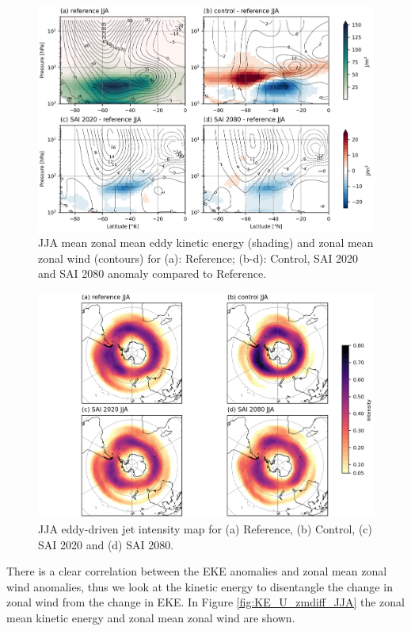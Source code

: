 \begin{figure}[H]
	\centering
	\includegraphics[width=0.95\linewidth]{images/EKE_U_zmdiff_JJA.png}
	\caption{JJA mean zonal mean eddy kinetic energy (shading) and zonal mean zonal wind (contours) for (a): Reference; (b-d): Control, SAI 2020 and SAI 2080 anomaly compared to Reference.}
	\label{fig:EKE_U_zmdiff_JJA}
\end{figure}

\begin{figure}[H]
	\centering
	\includegraphics[width=0.95\linewidth]{images/EDJ_map_JJA.png}
	\caption{JJA eddy-driven jet intensity map for (a) Reference, (b) Control, (c) SAI 2020 and (d) SAI 2080.}
	\label{fig:EDJ_map_JJA}
\end{figure}

There is a clear correlation between the EKE anomalies and zonal mean zonal wind anomalies, thus we look at the kinetic energy to disentangle the change in zonal wind from the change in EKE. In Figure \ref{fig:KE_U_zmdiff_JJA} the zonal mean kinetic energy and zonal mean zonal wind are shown. 

